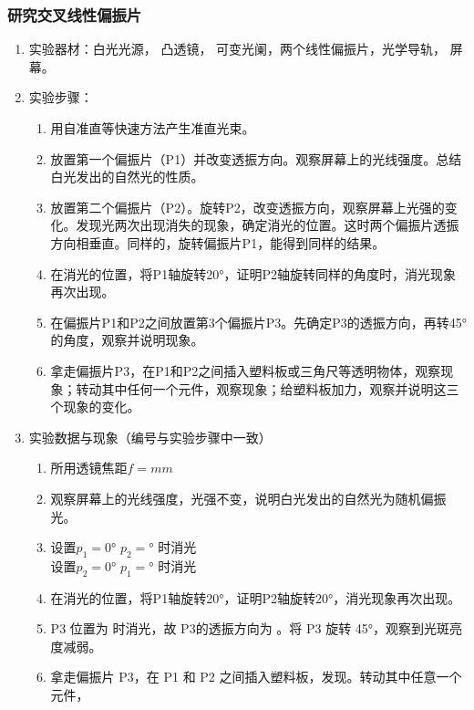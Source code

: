 \documentclass[dvipsnames, svgnames,a4paper,11pt]{article}
\begin{document}
	\subsubsection{研究交叉线性偏振片}
	\begin{enumerate}
	\item 实验器材：白光光源， 凸透镜， 可变光阑，两个线性偏振片，光学导轨， 屏幕。
	\item 实验步骤：
	\begin{enumerate}
		\item 用自准直等快速方法产生准直光束。
		\item 放置第一个偏振片（P1）并改变透振方向。观察屏幕上的光线强度。总结白光发出的自然光的性质。
    
    \item 放置第二个偏振片（P2）。旋转P2，改变透振方向，观察屏幕上光强的变化。发现光两次出现消失的现象，确定消光的位置。这时两个偏振片透振方向相垂直。同样的，旋转偏振片P1，能得到同样的结果。
    
    \item 在消光的位置，将P1轴旋转20°，证明P2轴旋转同样的角度时，消光现象再次出现。
    
    \item 在偏振片P1和P2之间放置第3个偏振片P3。先确定P3的透振方向，再转45°的角度，观察并说明现象。
    
    \item 拿走偏振片P3，在P1和P2之间插入塑料板或三角尺等透明物体，观察现象；转动其中任何一个元件，观察现象；给塑料板加力，观察并说明这三个现象的变化。
	\end{enumerate}	
	\item 实验数据与现象（编号与实验步骤中一致）
	 \begin{enumerate}
		\item 所用透镜焦距$f =  mm$
		\item 观察屏幕上的光线强度，光强不变，说明白光发出的自然光为随机偏振光。
		\item 设置$p_1=0°$ $p_2=   °$ 时消光\\
		设置$p_2=0°$ $p_1=   °$ 时消光
		\item 在消光的位置，将P1轴旋转20°，证明P2轴旋转20°，消光现象再次出现。
		\item P3 位置为  时消光，故 P3的透振方向为 。将 P3 旋转 45°，观察到光斑亮度减弱。
		\item 拿走偏振片 P3，在 P1 和 P2 之间插入塑料板，发现。转动其中任意一个元件，
	\end{enumerate}
	
\end{enumerate}	
\end{document}
